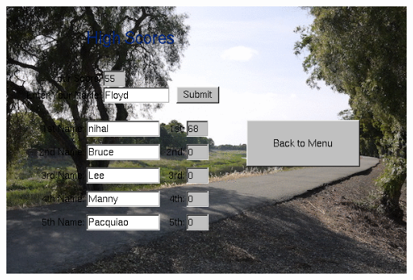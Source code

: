 \documentclass{article}
\begin{document}
\clearpage
\includegraphics[scale=0.5]{test7.png}
%
%
\end{document}
